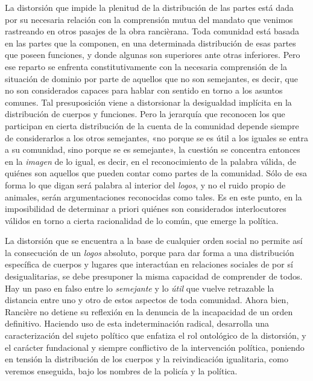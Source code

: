 La distorsión que impide la plenitud de la distribución de las partes está dada por su necesaria relación con la comprensión mutua del mandato que venimos rastreando en otros pasajes de la obra rancièrana. Toda comunidad está basada en las partes que la componen, en una determinada distribución de esas partes que poseen funciones, y donde algunas son superiores ante otras inferiores. Pero ese reparto se enfrenta constitutivamente con la necesaria comprensión de la situación de dominio por parte de aquellos que no son semejantes, es decir, que no son considerados capaces para hablar con sentido en torno a los asuntos comunes. Tal presuposición viene a distorsionar la desigualdad implícita en la distribución de cuerpos y funciones. Pero la jerarquía que reconocen los que participan en cierta distribución de la cuenta de la comunidad depende siempre de considerarlos a los otros semejantes, «no porque se es útil a los iguales se entra a su comunidad, sino porque se es semejante», la cuestión se concentra entonces en la\emph{ imagen} de lo igual, es decir, en el reconocimiento de la palabra válida, de quiénes son aquellos que pueden contar como partes de la comunidad. Sólo de esa forma lo que digan será palabra al interior del \emph{logos}, y no el ruido propio de animales, serán argumentaciones reconocidas como tales. Es en este punto, en la imposibilidad de determinar a priori quiénes son considerados interlocutores válidos en torno a cierta racionalidad de lo común, que emerge la política.

La distorsión que se encuentra a la base de cualquier orden social no permite así la consecución de un \emph{logos} absoluto, porque para dar forma a una distribución específica de cuerpos y lugares que interactúan en relaciones sociales de por sí desigualitarias, se debe presuponer la misma capacidad de comprender de todos. Hay un paso en falso entre lo \emph{semejante} y lo \emph{útil} que vuelve retrazable la distancia entre uno y otro de estos aspectos de toda comunidad. Ahora bien, Rancière no detiene su reflexión en la denuncia de la incapacidad de un orden definitivo. Haciendo uso de esta indeterminación radical, desarrolla una caracterización del sujeto político que enfatiza el rol ontológico de la distorsión, y el carácter fundacional y siempre conflictivo de la intervención política, poniendo en tensión la distribución de los cuerpos y la reivindicación igualitaria, como veremos enseguida, bajo los nombres de la policía y la política.

